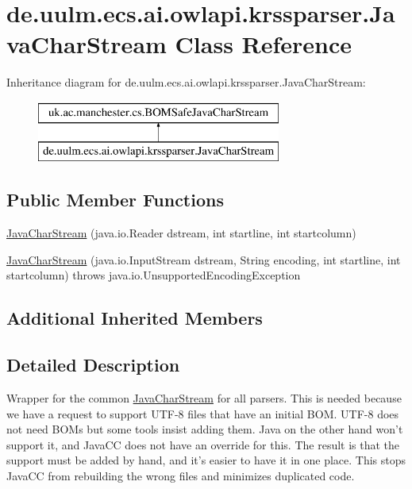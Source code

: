 \hypertarget{classde_1_1uulm_1_1ecs_1_1ai_1_1owlapi_1_1krssparser_1_1_java_char_stream}{\section{de.\-uulm.\-ecs.\-ai.\-owlapi.\-krssparser.\-Java\-Char\-Stream Class Reference}
\label{classde_1_1uulm_1_1ecs_1_1ai_1_1owlapi_1_1krssparser_1_1_java_char_stream}
}
Inheritance diagram for de.\-uulm.\-ecs.\-ai.\-owlapi.\-krssparser.\-Java\-Char\-Stream\-:\begin{figure}[H]
\begin{center}
\leavevmode
\includegraphics[height=2.000000cm]{classde_1_1uulm_1_1ecs_1_1ai_1_1owlapi_1_1krssparser_1_1_java_char_stream}
\end{center}
\end{figure}
\subsection*{Public Member Functions}
\begin{DoxyCompactItemize}
\item 
\hyperlink{classde_1_1uulm_1_1ecs_1_1ai_1_1owlapi_1_1krssparser_1_1_java_char_stream_a9397ac1497103afb408afa024e78a68c}{Java\-Char\-Stream} (java.\-io.\-Reader dstream, int startline, int startcolumn)
\item 
\hyperlink{classde_1_1uulm_1_1ecs_1_1ai_1_1owlapi_1_1krssparser_1_1_java_char_stream_aed92f5800462254c10107940958ddb46}{Java\-Char\-Stream} (java.\-io.\-Input\-Stream dstream, String encoding, int startline, int startcolumn)  throws java.\-io.\-Unsupported\-Encoding\-Exception 
\end{DoxyCompactItemize}
\subsection*{Additional Inherited Members}


\subsection{Detailed Description}
Wrapper for the common \hyperlink{classde_1_1uulm_1_1ecs_1_1ai_1_1owlapi_1_1krssparser_1_1_java_char_stream}{Java\-Char\-Stream} for all parsers. This is needed because we have a request to support U\-T\-F-\/8 files that have an initial B\-O\-M. U\-T\-F-\/8 does not need B\-O\-Ms but some tools insist adding them. Java on the other hand won't support it, and Java\-C\-C does not have an override for this. The result is that the support must be added by hand, and it's easier to have it in one place. This stops Java\-C\-C from rebuilding the wrong files and minimizes duplicated code. 


